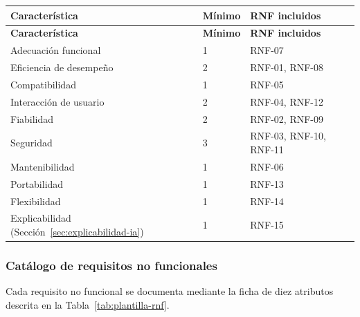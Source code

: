 \documentclass[12pt,a4paper]{article}
\begin{document}
\begin{center}
\begin{longtable}{|p{5cm}|p{2.2cm}|p{6cm}|}
\hline
\textbf{Característica} & \textbf{Mínimo} & \textbf{RNF incluidos} \\
\hline
\endfirsthead
\hline
\textbf{Característica} & \textbf{Mínimo} & \textbf{RNF incluidos} \\
\hline
\endhead
\hline
\endfoot
\hline
\endlastfoot
Adecuación funcional & 1 & RNF-07 \\
\hline
Eficiencia de desempeño & 2 & RNF-01, RNF-08 \\
\hline
Compatibilidad & 1 & RNF-05 \\
\hline
Interacción de usuario & 2 & RNF-04, RNF-12 \\
\hline
Fiabilidad & 2 & RNF-02, RNF-09 \\
\hline
Seguridad & 3 & RNF-03, RNF-10, RNF-11 \\
\hline
Mantenibilidad & 1 & RNF-06 \\
\hline
Portabilidad & 1 & RNF-13 \\
\hline
Flexibilidad & 1 & RNF-14 \\
\hline
Explicabilidad (Sección~\ref{sec:explicabilidad-ia}) & 1 & RNF-15 \\
\hline
\end{longtable}
\label{tab:cobertura-rnf}
\end{center}

\subsubsection{Catálogo de requisitos no funcionales}
\label{sec:catalogo-rnf}

Cada requisito no funcional se documenta mediante la ficha de diez atributos descrita en la Tabla~\ref{tab:plantilla-rnf}.
\end{document}
